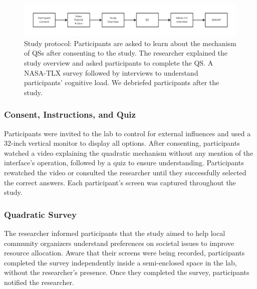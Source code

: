 \begin{figure}[ht!]
    \centering
    \includegraphics[width=\textwidth, trim=13 13 13 13, clip]{content/image/study_flow.pdf}
    \caption{Study protocol: Participants are asked to learn about the mechanism of QSs after consenting to the study. The researcher explained the study overview and asked participants to complete the QS. A NASA-TLX survey followed by interviews to understand participants' cognitive load. We debriefed participants after the study.}

    \label{fig:studyProtocol}
\end{figure}

\subsubsection{Consent, Instructions, and Quiz}
Participants were invited to the lab to control for external influences and used a 32-inch vertical monitor to display all options. After consenting, participants watched a video explaining the quadratic mechanism without any mention of the interface's operation, followed by a quiz to ensure understanding. Participants rewatched the video or consulted the researcher until they successfully selected the correct answers. Each participant's screen was captured throughout the study.

\subsubsection{Quadratic Survey}
The researcher informed participants that the study aimed to help local community organizers understand preferences on societal issues to improve resource allocation. Aware that their screens were being recorded, participants completed the survey independently inside a semi-enclosed space in the lab, without the researcher's presence. Once they completed the survey, participants notified the researcher.

